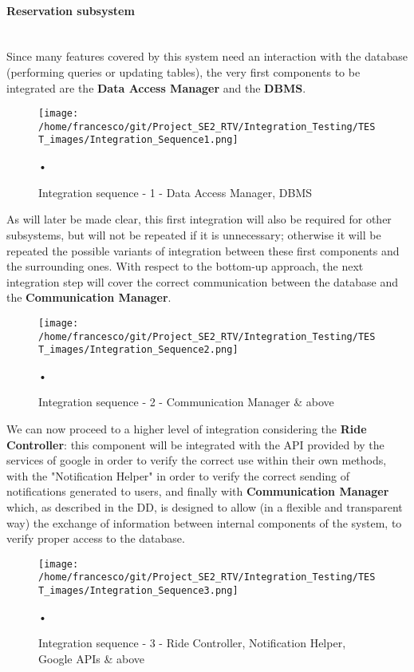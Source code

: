 \documentclass[10pt, a4paper,titlepage]{article}
\begin{document}
\paragraph{Reservation subsystem}\mbox{}\\
Since many features covered by this system need an interaction with the database (performing queries or updating tables), the very first components to be integrated are the \textbf{Data Access Manager} and the \textbf{DBMS}.
\begin{figure}[h]
\begin{center}
\texttt{[image: /home/francesco/git/Project\_SE2\_RTV/Integration\_Testing/TEST\_images/Integration\_Sequence1.png]}
\caption{Integration sequence - 1 - Data Access Manager, DBMS}
\label{fig:int_seq1}
\end{center}•
\end{figure}
\linebreak
As will later be made clear, this first integration will also be required for other subsystems, but will not be repeated if it is unnecessary; otherwise it will be repeated the possible variants of integration between these first components and the surrounding ones.
With respect to the bottom-up approach, the next integration step will cover the correct communication between the database and the \textbf{Communication Manager}.
\begin{figure}[h]
\begin{center}
\texttt{[image: /home/francesco/git/Project\_SE2\_RTV/Integration\_Testing/TEST\_images/Integration\_Sequence2.png]}
\caption{Integration sequence - 2 - Communication Manager \& above}
\label{fig:int_seq2}
\end{center}•
\end{figure}
\linebreak
We can now proceed to a higher level of integration considering the \textbf{Ride Controller}:
this component will be integrated with the API provided by the services of google in order to verify the correct use within their own methods, with the "Notification Helper" in order to verify the correct sending of notifications generated to users, and finally with \textbf{Communication Manager} which, as described in the DD, is designed to allow (in a flexible and transparent way) the exchange of information between internal components of the system, to verify proper access to the database.
\begin{figure}[h]
\begin{center}
\texttt{[image: /home/francesco/git/Project\_SE2\_RTV/Integration\_Testing/TEST\_images/Integration\_Sequence3.png]}
\caption{Integration sequence - 3 - Ride Controller, Notification Helper, Google APIs \& above}
\label{fig:int_seq3}
\end{center}•
\end{figure}
\end{document}

